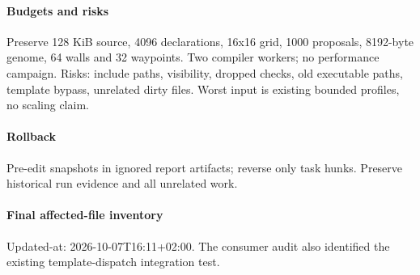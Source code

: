 \documentclass{article}
\begin{document}
\paragraph{Budgets and risks} Preserve 128 KiB source, 4096 declarations, 16x16 grid, 1000 proposals, 8192-byte genome, 64 walls and 32 waypoints. Two compiler workers; no performance campaign. Risks: include paths, visibility, dropped checks, old executable paths, template bypass, unrelated dirty files. Worst input is existing bounded profiles, no scaling claim.
\paragraph{Rollback} Pre-edit snapshots in ignored report artifacts; reverse only task hunks. Preserve historical run evidence and all unrelated work.
\paragraph{Final affected-file inventory} Updated-at: 2026-10-07T16:11+02:00. The consumer audit also identified the existing template-dispatch integration test.\begin{flushleft}\small
\texttt{}\\
\texttt{}\\
\texttt{}\\
\texttt{}\\
\texttt{}\\
\texttt{}\\
\texttt{}\\
\texttt{}\\
\texttt{}\\
\texttt{}\\
\texttt{}\\
\texttt{}\\
\texttt{}\\

\end{flushleft}
\end{document}
